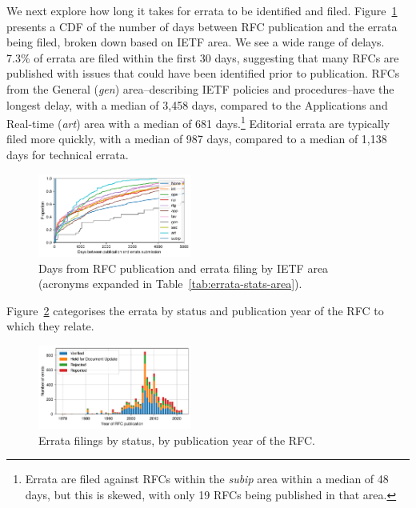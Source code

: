 \documentclass[twocolumn,10pt]{article}
\newcommand{\pb}[1]{\vspace{0.75ex}\noindent{\textbf{#1}}}
\begin{document}
\pb{Errata Delay:}
We next explore how long it takes for errata to be identified and filed.
Figure~\ref{fig:errata_submission_days} presents a CDF of the number of
days between RFC publication and the errata being filed, broken down based
on IETF area. We see a wide range of delays. 7.3\% of errata are filed
within the first 30 days, suggesting that many RFCs are published with
issues that could have been identified prior to publication.  RFCs from the
General (\emph{gen}) area--describing IETF policies and procedures--have
the longest delay, with a median of 3,458 days, compared to the
Applications and Real-time (\emph{art}) area with a median of 681
days.\footnote{Errata are filed against RFCs within the \emph{subip} area
within a median of 48 days, but this is skewed, with only 19 RFCs being
published in that area.} Editorial errata are typically filed more quickly,
with a median of 987 days, compared to a median of 1,138 days for technical
errata. 


\begin{figure}
\includegraphics[width=0.45\textwidth]{figures-prev/tma-2023/errata-submission-dates-area.pdf}
\caption{Days from RFC publication and errata filing by IETF area (acronyms
  expanded in Table~\ref{tab:errata-stats-area}).}
\label{fig:errata_submission_days}
\end{figure}


\pb{Errata Status:}
Figure~\ref{fig:errata_status} categorises the errata by status and
publication year of the RFC to which they relate. 

\begin{figure}
\includegraphics[width=0.45\textwidth]{figures-prev/tma-2023/errata-by-status.pdf}
\caption{Errata filings by status, by publication year of the RFC.}
\label{fig:errata_status}
\end{figure}
\end{document}
